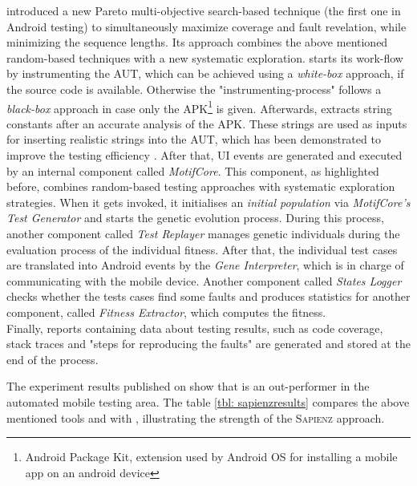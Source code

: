 \sapienz \cite{sapienz} introduced a new Pareto multi-objective search-based technique (the first one in Android testing) to simultaneously maximize coverage and fault revelation, while minimizing the sequence lengths. Its approach combines the above mentioned random-based techniques with a new systematic exploration. \sapienz starts its work-flow by instrumenting the AUT, which can be achieved using a \textit{white-box} approach, if the source code is available. Otherwise the "instrumenting-process" follows a \textit{black-box} approach in case only the APK\footnote{Android Package Kit, extension used by Android OS for installing a mobile app on an android device} is given.  
Afterwards, \sapienz extracts string constants after an accurate analysis of the APK. These strings are used as inputs for inserting realistic strings into the AUT, which has been demonstrated to improve the testing efficiency \cite{sapienz}. After that, UI events are generated and executed by an internal component called \textit{MotifCore}. 
This component, as highlighted before, combines random-based testing approaches with systematic exploration strategies. When it gets invoked, it initialises an \textit{initial population} via \textit{MotifCore's Test Generator} and starts the genetic evolution process. 
During this process, another component called \textit{Test Replayer} manages genetic individuals during the evaluation process of the individual fitness. After that, the individual test cases are translated into Android events by the \textit{Gene Interpreter}, which is in charge of communicating with the mobile device. 
Another component called \textit{States Logger} checks whether the tests cases find some faults and produces statistics for another component, called \textit{Fitness Extractor}, which computes the fitness. \\
Finally, reports containing data about testing results, such as code coverage, stack traces and "steps for reproducing the faults" are generated and stored at the end of the process.  


The experiment results published on \cite{sapienz} show that \sapienz is an out-performer in the automated mobile testing area. The table \ref{tbl: sapienzresults} compares the above mentioned tools \monkey and \dynodroid with \sapienz, illustrating the strength of the \textsc{Sapienz} approach. 

